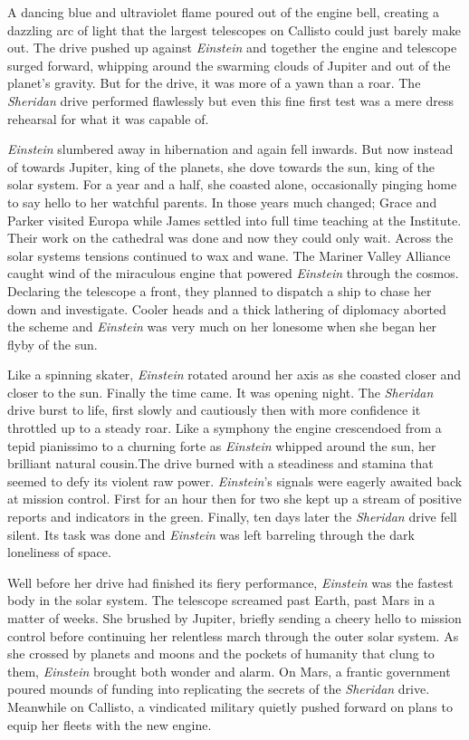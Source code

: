 \documentclass[openany, 12pt]{book} %
\begin{document}
A dancing blue and ultraviolet flame poured out of the engine bell, creating a dazzling arc of light that the largest telescopes on Callisto could just barely make out. The drive pushed up against \textit{Einstein} and together the engine and telescope surged forward, whipping around the swarming clouds of Jupiter and out of the planet's gravity. But for the drive, it was more of a yawn than a roar. The \textit{Sheridan} drive performed flawlessly but even this fine first test was a mere dress rehearsal for what it was capable of.

\textit{Einstein} slumbered away in hibernation and again fell inwards. But now instead of towards Jupiter, king of the planets, she dove towards the sun, king of the solar system. For a year and a half, she coasted alone, occasionally pinging home to say hello to her watchful parents. In those years much changed; Grace and Parker visited Europa while James settled into full time teaching at the Institute. Their work on the cathedral was done and now they could only wait. Across the solar systems tensions continued to wax and wane. The Mariner Valley Alliance caught wind of the miraculous engine that powered \textit{Einstein} through the cosmos. Declaring the telescope a front, they planned to dispatch a ship to chase her down and investigate. Cooler heads and a thick lathering of diplomacy aborted the scheme and \textit{Einstein} was very much on her lonesome when she began her flyby of the sun.

Like a spinning skater, \textit{Einstein} rotated around her axis as she coasted closer and closer to the sun. Finally the time came. It was opening night. The \textit{Sheridan} drive burst to life, first slowly and cautiously then with more confidence it throttled up to a steady roar. Like a symphony the engine crescendoed from a tepid pianissimo to a churning forte as \textit{Einstein} whipped around the sun, her brilliant natural cousin.The drive burned with a steadiness and stamina that seemed to defy its violent raw power. \textit{Einstein}'s signals were eagerly awaited back at mission control. First for an hour then for two she kept up a stream of positive reports and indicators in the green. Finally, ten days later the \textit{Sheridan} drive fell silent. Its task was done and \textit{Einstein} was left barreling through the dark loneliness of space.

Well before her drive had finished its fiery performance, \textit{Einstein} was the fastest body in the solar system. The telescope screamed past Earth, past Mars in a matter of weeks. She brushed by Jupiter, briefly sending a cheery hello to mission control before continuing her relentless march through the outer solar system. As she crossed by planets and moons and the pockets of humanity that clung to them, \textit{Einstein} brought both wonder and alarm. On Mars, a frantic government poured mounds of funding into replicating the secrets of the \textit{Sheridan} drive. Meanwhile on Callisto, a vindicated military quietly pushed forward on plans to equip her fleets with the new engine.
\end{document}
